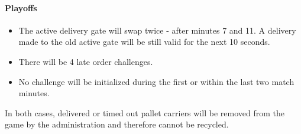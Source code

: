 \documentclass[12pt,twoside]{article}
\begin{document}
\paragraph{Playoffs}
\begin{itemize}
\item The active delivery gate will swap twice - after minutes 7
  and 11. A delivery made to the old active gate will be still
  valid for the next 10 seconds.
\item There will be 4 late order challenges. 
\item No challenge will be initialized during the first or within
  the last two match minutes.
\end{itemize}    


In both cases, delivered or timed out pallet carriers will be removed
from the game by the administration and therefore cannot be recycled.
\end{document}

